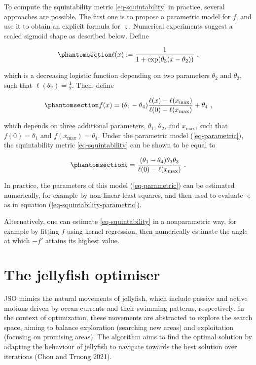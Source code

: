 \documentclass[
  12pt,
]{interact}
\theoremstyle{plain}
\begin{document}
To compute the squintability metric \eqref{eq-squintability} in
practice, several approaches are possible. The first one is to propose a
parametric model for \(f\), and use it to obtain an explicit formula for
\(\varsigma\). Numerical experiments suggest a scaled sigmoid shape as
described below. Define

\begin{equation}\phantomsection\label{eq-logistic}{
\ell(x):=\frac{1}{1+\exp(\theta_{3}(x-\theta_{2}))}\ ,
}\end{equation}

which is a decreasing logistic function depending on two parameters
\(\theta_2\) and \(\theta_3\), such that
\(\ell(\theta_{2})=\frac{1}{2}\). Then, define

\begin{equation}\phantomsection\label{eq-parametric}{
f(x)=(\theta_{1}-\theta_{4})\frac{\ell(x)-\ell(x_{\max})}{\ell(0)-\ell(x_{\max})}+\theta_{4}\ ,
}\end{equation}

which depends on three additional parameters, \(\theta_1\),
\(\theta_2\), and \(x_{\max}\), such that \(f(0)=\theta_1\) and
\(f(x_{\max})=\theta_4\). Under the parametric model
(\ref{eq-parametric}), the squintability metric \eqref{eq-squintability}
can be shown to be equal to

\begin{equation}\phantomsection\label{eq-squintability-parametric}{
\varsigma=\frac{(\theta_{1}-\theta_{4})\theta_{2}\theta_{3}}{\ell(0)-\ell(x_{\max})}\ .
}\end{equation}

In practice, the parameters of this model (\ref{eq-parametric}) can be
estimated numerically, for example by non-linear least squares, and then
used to evaluate \(\varsigma\) as in equation
(\ref{eq-squintability-parametric}).

Alternatively, one can estimate \eqref{eq-squintability} in a
nonparametric way, for example by fitting \(f\) using kernel regression,
then numerically estimate the angle at which \(-f'\) attains its highest
value.

\section{The jellyfish optimiser}\label{sec-JSO}

JSO mimics the natural movements of jellyfish, which include passive and
active motions driven by ocean currents and their swimming patterns,
respectively. In the context of optimization, these movements are
abstracted to explore the search space, aiming to balance exploration
(searching new areas) and exploitation (focusing on promising areas).
The algorithm aims to find the optimal solution by adapting the
behaviour of jellyfish to navigate towards the best solution over
iterations (Chou and Truong 2021).
\end{document}
